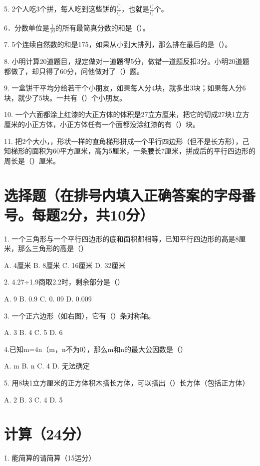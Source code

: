 \documentclass{../source/Paper}
\begin{document}
5. 2个人吃3个拼，每人吃到这些饼的$\displaystyle \frac{\mbox{()}}{\mbox{()}}$，也就是$\displaystyle \frac{\mbox{()}}{\mbox{()}}$个。

6．分数单位是$\displaystyle \frac{1}{10}$的所有最简真分数的和是（\qquad）。

7. 5个连续自然数的和是175，如果从小到大排列，那么排在最后的是（\qquad）。

8. 小明计算20道题目，规定做对一道题得5分，做错一道题反扣3分。小明20道题都做了，却只得了60分，问他做对了（\qquad）题。

9. 一盒饼干平均分给若干个小朋友，如果每人分4块，就多出3块；如果每人分6块，就少了5块。一共有（\qquad）个小朋友。

10. 一个六面都涂上红漆的大正方体的体积是27立方厘米，把它的切成27块1立方厘米的小正方体，小正方体任有一个面都没涂红漆的有（\qquad）块。

11. 把2个大小，，形状一样的直角梯形拼成一个平行四边形（但不是长方形），己知梯形的面积为60平方厘米，高为5厘米，一条腰长7厘米，拼成后的平行四边形的周长是（\qquad）厘米。

\section{选择题（在排号内填入正确答案的字母番号。每题2分，共10分）}

1. 一个三角形与一个平行四边形的底和面积都相等，已知平行四边形的高是8厘米，那么三角形的高是（\qquad）

A. 4厘米\qquad
B. 8厘米\qquad
C. 16厘米\qquad 
D. 32厘米

2. 4.27÷1.9商取2.2时，剩余部分是（\qquad）

A. 9\qquad 
B. 0.9\qquad 
C. 0. 09\qquad 
D. 0.009\qquad 

3. 一个正六边形（如右图），它有（\qquad）条对称轴。

A. 3\qquad
B. 4\qquad
C. 5\qquad
D. 6\qquad

4.已知m=4n（m，n不为0），那么m和n的最大公因数是（\qquad）

A. m\qquad
B. n\qquad
C. 4\qquad
D. 无法确定\qquad

5. 用8块1立方厘米的正方体积木搭长方体，可以搭出（\qquad）长方体（包括正方体）

A. 2\qquad
B. 3\qquad
C. 4\qquad
D. 5\qquad

\section{计算（24分）}

1. 能简算的请简算（15运分）
\end{document}
